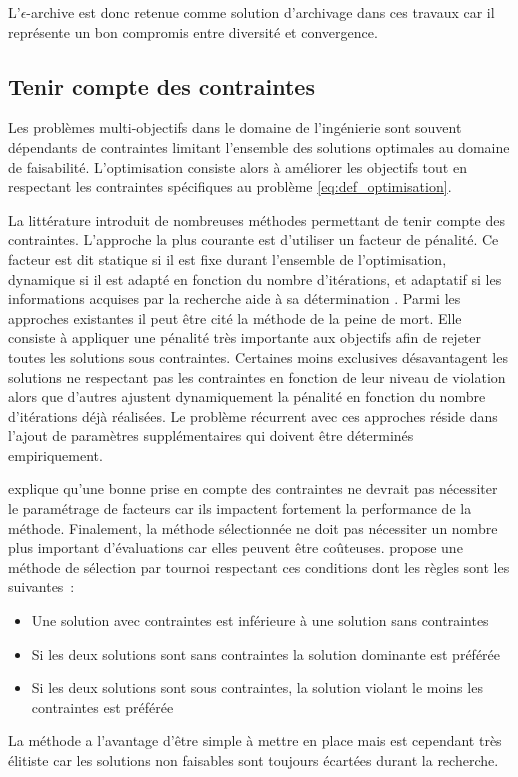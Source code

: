L’$\epsilon$-archive est donc retenue comme solution d’archivage dans ces travaux
car il représente un bon compromis entre diversité et convergence.


\subsection{Tenir compte des contraintes} %
\label{sub:tenir_compte_des_contraintes}
Les problèmes multi-objectifs dans le domaine de l’ingénierie sont souvent
dépendants de contraintes limitant l’ensemble des solutions optimales au domaine
de faisabilité. L’optimisation consiste alors à améliorer les objectifs tout en
respectant les contraintes spécifiques au problème \eqref{eq:def_optimisation}.

La littérature introduit de nombreuses méthodes permettant de tenir compte des
contraintes. L’approche la plus courante est d’utiliser un facteur de pénalité. Ce facteur
est dit statique si il est fixe durant l’ensemble de l’optimisation, dynamique si il est
adapté en fonction du nombre d’itérations, et adaptatif si les informations acquises par la
recherche aide à sa détermination \parencite{Coello2002}. Parmi les approches existantes il
peut être cité la méthode de la peine de mort. Elle consiste à appliquer une pénalité très
importante aux objectifs afin de rejeter toutes les solutions sous contraintes. Certaines
moins exclusives désavantagent les solutions ne respectant pas les contraintes en fonction
de leur niveau de violation alors que d’autres ajustent dynamiquement la pénalité en
fonction du nombre d’itérations déjà réalisées. Le problème récurrent avec ces approches
réside dans l’ajout de paramètres supplémentaires qui doivent être déterminés empiriquement.

\textcite{Coello2002} explique qu’une bonne prise en compte des contraintes ne devrait
pas nécessiter le paramétrage de facteurs car ils impactent
fortement la performance de la méthode. Finalement, la méthode sélectionnée ne
doit pas nécessiter un nombre plus important d’évaluations car elles peuvent être coûteuses.
\textcite{Deb2000311} propose une méthode de sélection par tournoi respectant ces conditions
dont les règles sont les suivantes~:
\begin{itemize}
  \item Une solution avec contraintes est inférieure à une solution sans contraintes
  \item Si les deux solutions sont sans contraintes la solution dominante est préférée
  \item Si les deux solutions sont sous contraintes, la solution violant le moins les contraintes est préférée
\end{itemize}
La méthode a l’avantage d’être simple à mettre en place mais est cependant
très élitiste car les solutions non faisables sont toujours écartées durant la
recherche.

